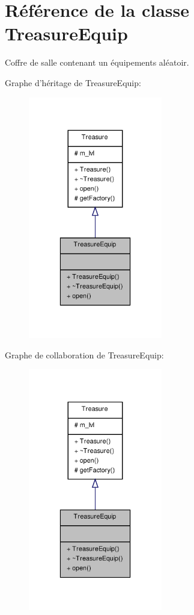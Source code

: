 \hypertarget{class_treasure_equip}{\section{Référence de la classe Treasure\-Equip}
\label{class_treasure_equip}
}


Coffre de salle contenant un équipements aléatoir.  




Graphe d'héritage de Treasure\-Equip\-:
\nopagebreak
\begin{figure}[H]
\begin{center}
\leavevmode
\includegraphics[width=166pt]{class_treasure_equip__inherit__graph}
\end{center}
\end{figure}


Graphe de collaboration de Treasure\-Equip\-:
\nopagebreak
\begin{figure}[H]
\begin{center}
\leavevmode
\includegraphics[width=166pt]{class_treasure_equip__coll__graph}
\end{center}
\end{figure}
